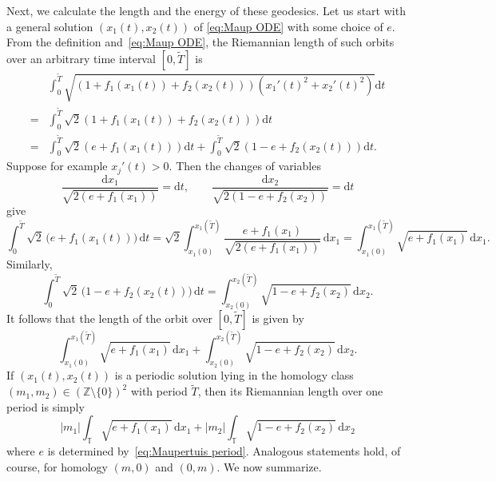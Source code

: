 \documentclass[11pt,letterpaper,oneside]{amsart}
\newcommand{\Z}{\mathbb{Z}}
\newcommand{\T}{\mathbb{T}}
\theoremstyle{definition}
\theoremstyle{remark}
\newcommand{\wt}{\widetilde}
\theoremstyle{definition}
\theoremstyle{remark}
\newcommand{\dif}{\mathrm{d}}
\begin{document}
Next, we calculate the length and the energy of these geodesics.
Let us start with a general solution $(x_1(t), x_2(t))$ of \eqref{eq:Maup ODE} with some choice of $e$.
From the definition and~\eqref{eq:Maup ODE}, the Riemannian length of such orbits over an arbitrary time interval $[0,\wt T]$ is
\begin{equation*}\begin{aligned}
    &\int_{0}^{\wt T} \sqrt{(1 + f_1(x_1(t)) + f_2(x_2(t))) (x_1'(t)^2 + x_2'(t)^2)} \dif t\\
    =&\int_{0}^{\wt T} \sqrt{2}(1 + f_1(x_1(t)) + f_2(x_2(t)))  \dif t\\
    =&\int_{0}^{\wt T} \sqrt{2}(e + f_1(x_1(t)))  \dif t+ 
    \int_{0}^{\wt T} \sqrt{2}(1 - e + f_2(x_2(t)))  \dif t.
\end{aligned}
\end{equation*}
Suppose for example $x_j'(t) > 0$. 
Then the changes of variables
\[
\frac{\dif x_1}{\sqrt{2(e+f_1(x_1))}}=\dif t,
\qquad
\frac{\dif x_2}{\sqrt{2(1-e+f_2(x_2))}}=\dif t
\]
give
\begin{equation}\label{eq:Maup T-length 1}
    \int_{0}^{\wt T}\sqrt{2}\,\bigl(e+f_1(x_1(t))\bigr)\,\dif t
=\sqrt{2}\int_{x_1(0)}^{x_1(\wt T)} \frac{e+f_1(x_1)}{\sqrt{2(e+f_1(x_1))}}\,\dif x_1
=\int_{x_1(0)}^{x_1(\wt T)} \sqrt{e+f_1(x_1)}\,\dif x_1.
\end{equation}
Similarly,
\begin{equation}\label{eq:Maup T-length 2}
    \int_{0}^{\wt T}\sqrt{2}\,\bigl(1-e+f_2(x_2(t))\bigr)\,\dif t=\int_{x_2(0)}^{x_2(\wt T)}\sqrt{1-e+f_2(x_2)}\,\dif x_2.
\end{equation}
It follows that the length of the orbit over $[0, \wt T]$ is given by 
\begin{equation*}
    \int_{x_1(0)}^{x_1(\wt T)} \sqrt{e+f_1(x_1)}\,\dif x_1 + \int_{x_2(0)}^{x_2(\wt T)}\sqrt{1-e+f_2(x_2)}\,\dif x_2.
\end{equation*}
If $(x_1(t), x_2(t))$ is a periodic solution lying in the homology class $(m_1, m_2) \in (\Z\setminus\{0\})^2$ with period $\wt T$, then its Riemannian length over one period is simply 
\begin{equation*}    |m_1|\int_{\T}\sqrt{e+f_1(x_1)}\,\dif x_1 + |m_2|\int_{\T}\sqrt{1-e+f_2(x_2)}\,\dif x_2
\end{equation*}
where $e$ is determined by~\eqref{eq:Maupertuis period}.
Analogous statements hold, of course, for homology $(m,0)$ and $(0,m)$.
We now summarize.
\end{document}
